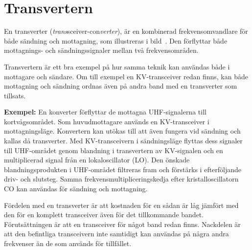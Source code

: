 \section{Transvertern}


En transverter (\emph{trans}sceiver-con\emph{verter}), är en kombinerad
frekvensomvandlare för både sändning och mottagning, som illustreras i
bild~.
Den förflyttar både mottagnings- och sändningssignaler mellan två
frekvensområden.

Transvertern är ett bra exempel på hur samma teknik kan användas både
i mottagare och sändare.
Om till exempel en KV-transceiver redan finns, kan både mottagning och sändning
ordnas även på andra band med en transverter som tillsats.

\textbf{Exempel:}
En konverter förflyttar de mottagna UHF-signalerna till kortvågsområdet.
Som huvudmottagare används en KV-transceiver i mottagningsläge.
Konvertern kan utökas till att även fungera vid sändning och kallas då
transverter.
Med KV-transceivern i sändningsläge flyttas dess signaler till UHF-området
genom blandning i transvertern av KV-signalen och en multiplicerad signal
från en lokaloscillator (LO).
Den önskade blandningsprodukten i UHF-området filtreras fram och förstärks i
efterföljande driv- och slutsteg.
Samma frekvensmultipliceringskedja efter kristalloscillatorn CO kan användas
för sändning och mottagning.

Fördelen med en transverter är att kostnaden för en sådan är låg jämfört med
den för en komplett transceiver även för det tillkommande bandet.
Förutsättningen är att en transceiver för något band redan finns.
Nackdelen är att den befintliga transceivern inte samtidigt kan användas på
några andra frekvenser än de som används för tillfället.
